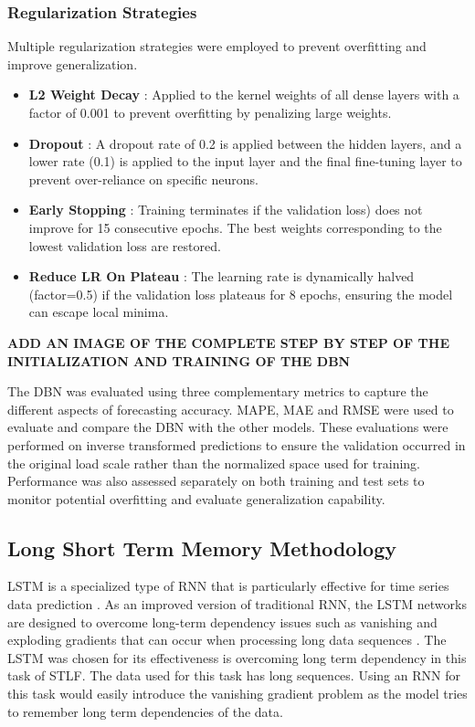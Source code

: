  \subsubsection{Regularization Strategies}
 Multiple regularization strategies were employed to prevent overfitting and improve generalization.
 
 \begin{itemize}
 	\item \textbf{L2 Weight Decay} : Applied to the kernel weights of all dense layers with a factor of 0.001 to prevent overfitting by penalizing large weights.
 	\item \textbf{Dropout} : A dropout rate of 0.2 is applied between the hidden layers, and a lower rate (0.1) is applied to the input layer and the final fine-tuning layer to prevent over-reliance on specific neurons.
 	\item \textbf{Early Stopping} : Training terminates if the validation loss) does not improve for 15 consecutive epochs. The best weights corresponding to the lowest validation loss are restored.
 	\item \textbf{Reduce LR On Plateau} : The learning rate is dynamically halved (factor=0.5) if the validation loss plateaus for 8 epochs, ensuring the model can escape local minima.
 \end{itemize}
 
 \textbf{ ADD AN IMAGE OF THE COMPLETE STEP BY STEP OF THE INITIALIZATION AND TRAINING OF THE DBN}
 
 
 The DBN was evaluated using three complementary metrics to capture the different aspects of forecasting accuracy. MAPE, MAE and RMSE were used to evaluate and compare the DBN with the other models. These evaluations were performed on inverse transformed predictions to ensure the validation occurred in the original load scale rather than the normalized space used for training. Performance was also assessed separately on both training and test sets to monitor potential overfitting and evaluate generalization capability.
 
 
 
 \subsection{Long Short Term Memory Methodology}
 
 LSTM is a specialized type of RNN that is particularly effective for time series data prediction \cite{rafi2021short}
 . As an improved version of traditional RNN, the LSTM networks are designed to overcome long-term dependency issues such as vanishing and exploding gradients that can occur when processing long data sequences \cite{boopathy2024deep}. The LSTM was chosen for its effectiveness is overcoming long term dependency in this task of STLF. The data used for this task has long sequences. Using an RNN for this task would easily introduce the vanishing gradient problem as the model tries to remember long term dependencies of the data.
 
